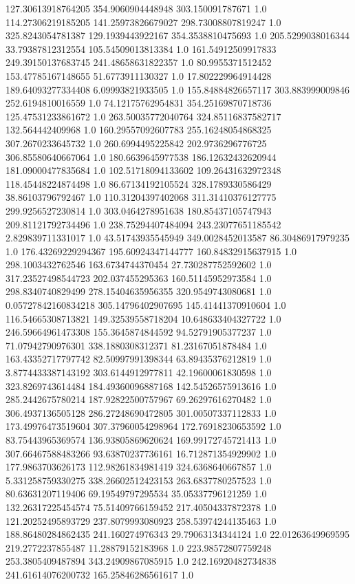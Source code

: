 127.30613918764205	354.9060904448948	303.150091787671	1.0
114.27306219185205	141.25973826679027	298.73008807819247	1.0
325.8243054781387	129.1939443922167	354.3538810475693	1.0
205.5299038016344	33.79387812312554	105.54509013813384	1.0
161.54912509917833	249.39150137683745	241.48658631822357	1.0
80.9955371512452	153.47785167148655	51.6773911130327	1.0
17.802229964914428	189.64093277334408	6.09993821933505	1.0
155.84884826657117	303.883999009846	252.6194810016559	1.0
74.12175762954831	354.25169870718736	125.47531233861672	1.0
263.50035772040764	324.85116837582717	132.564442409968	1.0
160.29557092607783	255.16248054868325	307.2670233645732	1.0
260.6994495225842	202.9736296776725	306.85580640667064	1.0
180.6639645977538	186.12632432620944	181.09000477835684	1.0
102.51718094133602	109.26431632972348	118.45448224874498	1.0
86.67134192105524	328.1789330586429	38.86103796792467	1.0
110.31204397402068	311.31410376127775	299.9256527230814	1.0
303.0464278951638	180.85437105747943	209.81121792734496	1.0
238.75294407484094	243.23077651185542	2.829839711331017	1.0
43.51743935545949	349.0028452013587	86.30486917979235	1.0
176.43269229294367	195.60924347144777	160.84832915637915	1.0
298.1003432762546	163.6734744370454	27.730287752592602	1.0
317.23527498544723	202.037455295363	160.51145952973584	1.0
298.8340740829499	278.15404635956355	320.9549743080681	1.0
0.05727842160834218	305.14796402907695	145.41441370910604	1.0
116.54665308713821	149.32539558718204	10.648633404327722	1.0
246.59664961473308	155.3645874844592	94.52791905377237	1.0
71.07942790976301	338.1880308312371	81.23167051878484	1.0
163.43352717797742	82.50997991398344	63.89435376212819	1.0
3.8774433387143192	303.6144912977811	42.19600061830598	1.0
323.8269743614484	184.49360096887168	142.54526575913616	1.0
285.2442675780214	187.92822500757967	69.26297616270482	1.0
306.4937136505128	286.27248690472805	301.00507337112833	1.0
173.49976473519604	307.37960054298964	172.76918230653592	1.0
83.75443965369574	136.93805869620624	169.99172745721413	1.0
307.66467588483266	93.63870237736161	16.712871354929902	1.0
177.9863703626173	112.98261834981419	324.6368640667857	1.0
5.331258759330275	338.26602512423153	263.6837780257523	1.0
80.63631207119406	69.19549797295534	35.05337796121259	1.0
132.26317225454574	75.51409766159452	217.40504337872378	1.0
121.20252495893729	237.8079993080923	258.53974244135463	1.0
188.86480284862435	241.160274976343	29.79063134344124	1.0
22.01263649969595	219.2772237855487	11.28879152183968	1.0
223.98572807759248	253.3805409487894	343.24909867085915	1.0
242.16920482734838	241.61614076200732	165.25846286561617	1.0
